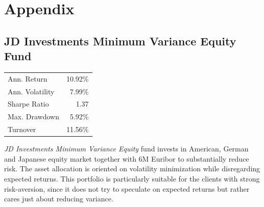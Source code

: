 \documentclass[11pt, parskip=full, DIV=14, headings=small, footsepline, footinclude=false, headsepline]{scrreprt}
\begin{document}

\newpage
\chapter{Appendix}
\section{JD Investments Minimum Variance Equity Fund}
\begin{table}
  \begin{tabular}{lr}
  \toprule
  Ann. Return & 10.92\%\\
  Ann. Volatility & 7.99\%\\
  Sharpe Ratio & 1.37\\
  Max. Drawdown & 5.92\% \\
  Turnover & 11.56\%\\
  \bottomrule
  \end{tabular}
\end{table}
\textit{JD Investments Minimum Variance Equity} fund invests in American, German and Japanese equity market together with 6M Euribor to substantially reduce risk.
The asset allocation is oriented on volatility minimization while disregarding expected returns.
This portfolio is particularly suitable for the clients with strong risk-aversion, since it does not try to speculate on expected returns but rather cares just about reducing variance.
\end{document}
